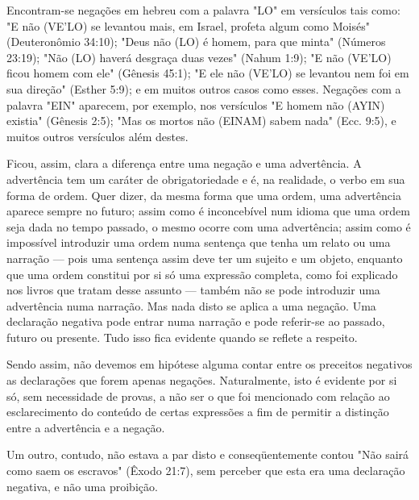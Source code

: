 \begin{itemize}
\begin{enumrate}
Encontram-se negações em hebreu com a palavra "LO" em versícu­los tais
como: "E não (VE'LO) se levantou mais, em Israel, profeta algum como
Moisés" (Deuteronômio 34:10); "Deus não (LO) é homem, para que minta"
(Nú­meros 23:19); "Não (LO) haverá desgraça duas vezes" (Nahum 1:9); "E
não (VE'LO) ficou homem com ele" (Gênesis 45:1); "E ele não (VE'LO) se
levantou nem foi em sua direção" (Esther 5:9); e em muitos outros casos
como esses. Negações com a palavra "EIN" aparecem, por exemplo, nos
versículos "E homem 
não (AYIN) existia" (Gênesis 2:5); "Mas os mortos não (EINAM) sabem
nada" (Ecc. 9:5), e muitos outros versículos além destes.

Ficou, assim, clara a diferença entre uma negação e uma advertên­cia. A
advertência tem um caráter de obrigatoriedade e é, na realidade, o verbo
em sua forma de ordem. Quer dizer, da mesma forma que uma ordem, uma
advertência aparece sempre no futuro; assim como é inconcebível num
idioma que uma ordem seja dada no tempo passado, o mesmo ocorre com uma
adver­tência; assim como é impossível introduzir uma ordem numa sentença
que te­nha um relato ou uma narração --- pois uma sentença assim deve
ter um sujeito e um objeto, enquanto que uma ordem constitui por si só
uma expressão com­pleta, como foi explicado nos livros que tratam desse
assunto --- também não se pode introduzir uma advertência numa narração.
Mas nada disto se aplica a uma negação. Uma declaração negativa pode
entrar numa narração e pode referir-se ao passado, futuro ou presente.
Tudo isso fica evidente quando se reflete a respeito.

Sendo assim, não devemos em hipótese alguma contar entre os pre­ceitos
negativos as declarações que forem apenas negações. Naturalmente, isto é
evidente por si só, sem necessidade de provas, a não ser o que foi
menciona­do com relação ao esclarecimento do conteúdo de certas
expressões a fim de permitir a distinção entre a advertência e a
negação.

Um outro, contudo, não estava a par disto e conseqüentemente con­tou
"Não sairá como saem os escravos" (Êxodo 21:7), sem perceber que esta
era uma declaração negativa, e não uma proibição.


\end{enumrate}
\end{itemize}
